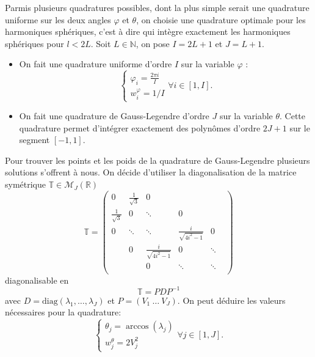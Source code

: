 \documentclass[11pt]{article}
\newcommand{\R}{\mathbb{R}}
\newcommand{\N}{\mathbb{N}}
\begin{document}
Parmis plusieurs quadratures possibles, dont la plus simple serait une quadrature uniforme sur les deux angles $\varphi$ et $\theta$, on
choisie une quadrature optimale pour les harmoniques sphériques, c'est à dire qui intègre exactement les harmoniques sphériques pour
$l<2L$. Soit $L\in\N$, on pose $I = 2L+1$ et $J=L+1$.
\begin{itemize}
\item On fait une quadrature uniforme d'ordre $I$ sur la variable $\varphi$ :
  \[
    \begin{cases}
      \varphi_i = \frac{2 \pi i}{I} \\
      w^\varphi_i = 1/I
    \end{cases}
    \forall i \in [1, I].
  \]
\item On fait une quadrature de Gauss-Legendre d'ordre $J$ sur la variable $\theta$. Cette quadrature permet d'intégrer exactement des
  polynômes d'ordre $2J+1$ sur le segment $[-1,1]$.
\end{itemize}
Pour trouver les points et les poids de la quadrature de Gauss-Legendre plusieurs solutions s'offrent à nous. On décide d'utiliser la
diagonalisation de la matrice symétrique $ \mathbb{T} \in \mathcal{M}_J(\R) $
\[
  \mathbb{T} = \left(
    \begin{matrix}
      0                  & \frac{1}{\sqrt{3}} & 0                       &                          &        &      \\
      \frac{1}{\sqrt{3}} & 0                  & \ddots                  & 0                        &        &      \\
      0                  & \ddots             & \ddots                  & \frac{i}{\sqrt{4i^2-1}}  & 0      &      \\
      ~                  & 0                  & \frac{i}{\sqrt{4i^2-1}} & 0                        & \ddots &      \\
      ~                  &                    & 0                       & \ddots                   & \ddots &      \\
      ~                  &                    &                         &                          &        &     
    \end{matrix}
  \right)
\]
diagonalisable en 
\[
  \mathbb{T} = P D P^{-1}
\]
avec $D = \text{diag}(\lambda_1, \dots, \lambda_J)$ et $P = (V_1~\dots~V_J)$. On peut déduire les valeurs nécessaires pour la quadrature:
\[
  \begin{cases}
    \theta_j = \arccos(\lambda_j) \\
    w^\theta_j = 2 V_j^2
  \end{cases}
  \forall j \in [1, J].
\]
\end{document}
